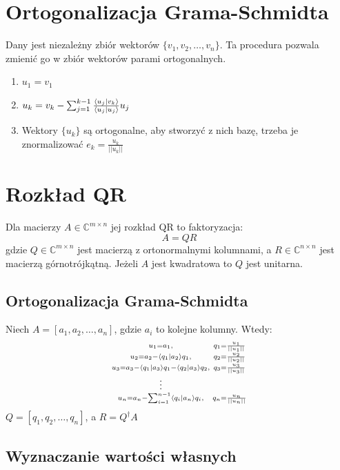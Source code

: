 \documentclass{../notatki}
\begin{document}
\section{Ortogonalizacja Grama-Schmidta}

Dany jest niezależny zbiór wektorów $\{v_1, v_2, \dots, v_n\}$. Ta procedura
pozwala zmienić go w zbiór wektorów parami ortogonalnych.
\begin{enumerate}
  \item $u_1 = v_1$
  \item $u_k = v_k - \sum_{j=1}^{k - 1}
    \frac{\braket{u_j}{v_k}}{\braket{u_j}{u_j}}u_j$
  \item Wektory $\{u_k\}$ są ortogonalne, aby stworzyć z nich bazę, trzeba
    je znormalizować $e_k = \frac{u_k}{||u_k||}$
\end{enumerate}

\section{Rozkład QR}

Dla macierzy $A \in \mathbb{C}^{m \times n}$ jej rozkład QR to faktoryzacja:
$$
A = QR
$$
gdzie $Q \in \mathbb{C}^{m \times n}$ jest macierzą z ortonormalnymi kolumnami,
a $R \in \mathbb{C}^{n \times n}$ jest macierzą górnotrójkątną.
Jeżeli $A$ jest kwadratowa to $Q$ jest unitarna.

\subsection{Ortogonalizacja Grama-Schmidta}

Niech $A = \left[a_1, a_2, \dots, a_n\right]$, gdzie $a_i$ to kolejne kolumny.
Wtedy:
$$
\begin{smallmatrix}
  u_1 = a_1, & q_1 = \frac{u_1}{||u_1||} \\
  u_2 = a_2 - \braket{q_1}{a_2}q_1, & q_2 = \frac{u_2}{||u_2||} \\
  u_3 = a_3 - \braket{q_1}{a_3}q_1 - \braket{q_2}{a_3}q_2, & q_3 =
  \frac{u_3}{||u_3||}\\
  \vspace{0.2em}\vdots & \\
  u_n = a_n - \sum_{i = 1}^{n - 1} \braket{q_i}{a_n} q_i, & q_n =
  \frac{u_n}{||u_n||}
\end{smallmatrix}
$$
$Q = \left[q_1, q_2, \dots, q_n\right]$, a $R = Q^\dag A$

\subsection{Wyznaczanie wartości własnych}
\end{document}
